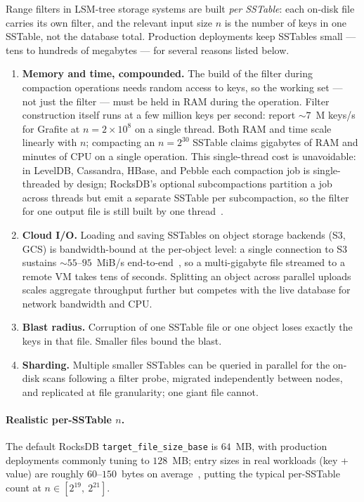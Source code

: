 Range filters in LSM-tree storage systems are built \emph{per SSTable}:
each on-disk file carries its own filter, and the relevant input size $n$
is the number of keys in one SSTable, not the database total. Production
deployments keep SSTables small --- tens to hundreds of megabytes --- for
several reasons listed below.

\begin{enumerate}
    \item \textbf{Memory and time, compounded.} The build of the filter during compaction operations
    needs random access to keys,
    so the working set --- not just the filter --- must be held in RAM during the operation.
    Filter construction itself runs at a few million keys per second:
    \citet{grafite2024} report ${\sim}7$~M keys/s for
    Grafite at $n = 2 \times 10^8$ on a single thread.
    Both RAM and time scale linearly with $n$; compacting an $n = 2^{30}$ SSTable
    claims gigabytes of RAM and minutes of CPU on a single operation.
    This single-thread cost is unavoidable: in LevelDB, Cassandra, HBase,
    and Pebble each compaction job is single-threaded by design;
    RocksDB's optional subcompactions partition a job across threads but
    emit a separate SSTable per subcompaction, so the filter for one
    output file is still built by one thread~\citep{dong2021rocksdb}.
    \item \textbf{Cloud I/O.} Loading and saving SSTables on object
    storage backends (S3, GCS) is bandwidth-bound at the per-object
    level: a single connection to S3 sustains ${\sim}55$--$95$~MiB/s
    end-to-end~\citep{durner2023cloud}, so a multi-gigabyte file
    streamed to a remote VM takes tens of seconds.
    Splitting an object across parallel uploads scales aggregate throughput
    further but competes with the live database for network bandwidth and CPU.
    \item \textbf{Blast radius.} Corruption of one SSTable file or one
    object loses exactly the keys in that file. Smaller files bound the blast.
    \item \textbf{Sharding.} Multiple smaller SSTables can be queried in
    parallel for the on-disk scans following a filter probe, migrated
    independently between nodes, and replicated at file granularity; one
    giant file cannot.
\end{enumerate}

\paragraph{Realistic per-SSTable $n$.}
The default RocksDB \texttt{target\_file\_size\_base} is $64$~MB, with
production deployments commonly tuning to $128$~MB; entry sizes in
real workloads (key + value) are roughly $60$--$150$~bytes on
average~\citep{cao2020facebook}, putting the typical per-SSTable count
at $n \in [2^{19},\ 2^{21}]$.

